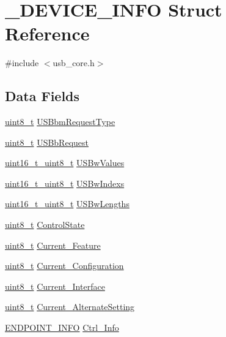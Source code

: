 \hypertarget{struct___d_e_v_i_c_e___i_n_f_o}{\section{\-\_\-\-D\-E\-V\-I\-C\-E\-\_\-\-I\-N\-F\-O Struct Reference}
\label{struct___d_e_v_i_c_e___i_n_f_o}
}


{\ttfamily \#include $<$usb\-\_\-core.\-h$>$}

\subsection*{Data Fields}
\begin{DoxyCompactItemize}
\item 
\hyperlink{stdint_8h_aba7bc1797add20fe3efdf37ced1182c5}{uint8\-\_\-t} \hyperlink{struct___d_e_v_i_c_e___i_n_f_o_aa6c4e2ccb90731a53b4ba9b68ec8dca1}{U\-S\-Bbm\-Request\-Type}
\item 
\hyperlink{stdint_8h_aba7bc1797add20fe3efdf37ced1182c5}{uint8\-\_\-t} \hyperlink{struct___d_e_v_i_c_e___i_n_f_o_a9f741f45aaef97ec60cc0c31eed606f1}{U\-S\-Bb\-Request}
\item 
\hyperlink{unionuint16__t__uint8__t}{uint16\-\_\-t\-\_\-uint8\-\_\-t} \hyperlink{struct___d_e_v_i_c_e___i_n_f_o_a467c50f521daf1bbee06bf132f2f7bf1}{U\-S\-Bw\-Values}
\item 
\hyperlink{unionuint16__t__uint8__t}{uint16\-\_\-t\-\_\-uint8\-\_\-t} \hyperlink{struct___d_e_v_i_c_e___i_n_f_o_a7814966767a83ab0f0152a018c566e44}{U\-S\-Bw\-Indexs}
\item 
\hyperlink{unionuint16__t__uint8__t}{uint16\-\_\-t\-\_\-uint8\-\_\-t} \hyperlink{struct___d_e_v_i_c_e___i_n_f_o_ac5ddedbe1c26f4b7baa6fe036ac7bdbe}{U\-S\-Bw\-Lengths}
\item 
\hyperlink{stdint_8h_aba7bc1797add20fe3efdf37ced1182c5}{uint8\-\_\-t} \hyperlink{struct___d_e_v_i_c_e___i_n_f_o_a7fff45594ea8c983ded1668adbba1f6e}{Control\-State}
\item 
\hyperlink{stdint_8h_aba7bc1797add20fe3efdf37ced1182c5}{uint8\-\_\-t} \hyperlink{struct___d_e_v_i_c_e___i_n_f_o_a90eada3e40cddf2ede2d1ebf6db7990e}{Current\-\_\-\-Feature}
\item 
\hyperlink{stdint_8h_aba7bc1797add20fe3efdf37ced1182c5}{uint8\-\_\-t} \hyperlink{struct___d_e_v_i_c_e___i_n_f_o_acbc75bcc43a273a84f3d1868809ae6e3}{Current\-\_\-\-Configuration}
\item 
\hyperlink{stdint_8h_aba7bc1797add20fe3efdf37ced1182c5}{uint8\-\_\-t} \hyperlink{struct___d_e_v_i_c_e___i_n_f_o_a998446082a922f5918aeb677516857e5}{Current\-\_\-\-Interface}
\item 
\hyperlink{stdint_8h_aba7bc1797add20fe3efdf37ced1182c5}{uint8\-\_\-t} \hyperlink{struct___d_e_v_i_c_e___i_n_f_o_ae60c3351298415d61faa45fc5ca80f17}{Current\-\_\-\-Alternate\-Setting}
\item 
\hyperlink{_s_t_m32_f10x_2_libraries_2_s_t_m32___u_s_b-_f_s-_device___driver_2inc_2usb__core_8h_a19ad46709b2d54f72c82ed0b9befdb99}{E\-N\-D\-P\-O\-I\-N\-T\-\_\-\-I\-N\-F\-O} \hyperlink{struct___d_e_v_i_c_e___i_n_f_o_a08b303e9ee05ebd5ea7eeb783c8ec601}{Ctrl\-\_\-\-Info}
\end{DoxyCompactItemize}


